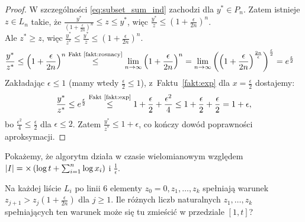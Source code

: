 \begin{proof}
	W szczególności \eqref{eq:subset_sum_ind} zachodzi dla $y^* \in P_n$. Zatem istnieje $z \in L_n$ takie, że $\frac{y^*}{\left(1+\frac{\epsilon}{2n}\right)^n} \le z \le y^*$, więc $\frac{y^*}{z} \le \left(1+\frac{\epsilon}{2n}\right)^n$. \\
	Ale $z^* \ge z$, więc $\frac{y^*}{z^*} \le \frac{y^*}{z} \le \left(1+\frac{\epsilon}{2n}\right)^n$. \\
	\begin{align*}
		\frac{y^*}{z^*} & \le \left(1+\frac{\epsilon}{2n}\right)^n \overset{\text{Fakt~\ref{fakt:rosnacy}}}{\le} \lim_{n\to\infty} \left(1+\frac{\epsilon}{2n}\right)^n = \lim_{n\to\infty} \left(\left(1+\frac{\epsilon}{2n}\right)^{\frac{2n}{\epsilon}}\right)^{\frac{\epsilon}{2}} = e^{\frac{\epsilon}{2}}
	\end{align*}
	Zakładając $\epsilon \le 1$ (mamy wtedy $\frac{\epsilon}{2} \le 1$), z~Faktu~\ref{fakt:exp} dla $x = \frac{\epsilon}{2}$ dostajemy:
	\begin{align*}
		\frac{y^*}{z^*} \le e^{\frac{\epsilon}{2}} \overset{\text{Fakt~\ref{fakt:exp}}}{\le} 1 + \frac{\epsilon}{2} + \frac{\epsilon^2}{4} \le 1 + \frac{\epsilon}{2} + \frac{\epsilon}{2} = 1 + \epsilon,
	\end{align*}
	bo $\frac{\epsilon^2}{4} \le \frac{\epsilon}{2}$ dla $\epsilon \le 2$. Zatem $\frac{y^*}{z^*} \le 1 + \epsilon$, co kończy dowód poprawności aproksymacji.
\end{proof}

Pokażemy, że algorytm działa w czasie wielomianowym względem $|I| = \mathcal{\Theta}\left(\log t + \sum_{i=1}^n \log x_i\right)$ i $\frac{1}{\epsilon}$.

Na każdej liście $L_i$ po linii 6 elementy $z_0=0, z_1, \dots, z_k$ spełniają warunek $z_{j+1} > z_j\left(1 + \frac{\epsilon}{2n}\right)$ dla $j \ge 1$.
Ile różnych liczb naturalnych $z_1, \dots, z_k$ spełniających ten warunek może się tu zmieścić w przedziale $[1, t]$?

